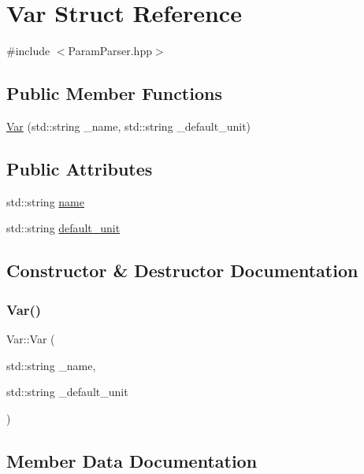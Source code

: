 \hypertarget{struct_var}{}\section{Var Struct Reference}
\label{struct_var}


{\ttfamily \#include $<$Param\+Parser.\+hpp$>$}

\subsection*{Public Member Functions}
\begin{DoxyCompactItemize}
\item 
\hyperlink{struct_var_acd32463974964de2ddbb3de36a508ed0}{Var} (std\+::string \+\_\+name, std\+::string \+\_\+default\+\_\+unit)
\end{DoxyCompactItemize}
\subsection*{Public Attributes}
\begin{DoxyCompactItemize}
\item 
std\+::string \hyperlink{struct_var_ad112053ba9381eb7b8b26b3c5702410a}{name}
\item 
std\+::string \hyperlink{struct_var_adadd3377feb65e8bc4cfa10978918b4d}{default\+\_\+unit}
\end{DoxyCompactItemize}


\subsection{Constructor \& Destructor Documentation}
\mbox{\label{struct_var_acd32463974964de2ddbb3de36a508ed0}} 
\subsubsection{\texorpdfstring{Var()}{Var()}}
{\footnotesize\ttfamily Var\+::\+Var (\begin{DoxyParamCaption}\item[{std\+::string}]{\+\_\+name,  }\item[{std\+::string}]{\+\_\+default\+\_\+unit }\end{DoxyParamCaption})\hspace{0.3cm}{\ttfamily [inline]}}



\subsection{Member Data Documentation}
\mbox{\label{struct_var_adadd3377feb65e8bc4cfa10978918b4d}} 
